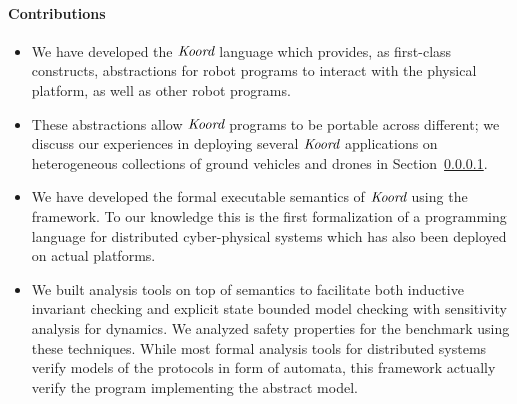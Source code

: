 \paragraph{Contributions}
\begin{itemize}
\item  We have developed the $\emph{Koord}$ language which provides, as first-class constructs,  abstractions for robot  programs to interact with the physical platform, as well as other robot programs.
\item These abstractions allow $\emph{Koord}$ programs to be portable across different; we  discuss our experiences in deploying several $\emph{Koord}$ applications on heterogeneous collections of ground vehicles and drones in Section~\ref{}. 
\item  We have developed the formal executable semantics of $\emph{Koord}$ using the \K framework. To our knowledge this is the first formalization of a programming language for distributed cyber-physical systems which has also been deployed on actual platforms.
\item  We built analysis tools on top of semantics to facilitate both inductive invariant checking and explicit state bounded model checking with sensitivity analysis for dynamics. We analyzed safety properties for the benchmark using these techniques. While most formal analysis tools for distributed systems verify models of the protocols in form of automata, this framework actually verify the program implementing the abstract model. 


\end{itemize}
